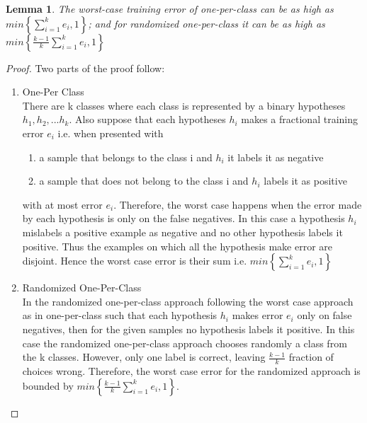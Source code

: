 \documentclass[11pt]{article}
\newtheorem{lemma}[theorem]{Lemma}
\begin{document}
   \begin{lemma} 
        The worst-case training error of one-per-class can be as high as $min\left\{\sum_{i=1}^k e_i , 1\right\}$; and for randomized one-per-class it can be as high as $min\left\{\frac{k-1}{k}\sum_{i=1}^k e_i,1\right\}$
   \end{lemma}
   \begin{proof} 
        Two parts of the proof follow:
         \begin{enumerate}
                \item One-Per Class\\
                    There are k classes where each class is represented by a binary hypotheses $h_1,h_2,...h_k$. Also suppose that each hypotheses $h_i$ makes a fractional training error $e_i$ i.e. when presented with 
                    \begin{enumerate}
                        \item a sample that belongs to the class i and $h_i$ it labels it as negative
                         \item a sample that does not belong to the class i and $h_i$ labels it as positive
                    \end{enumerate}
                    with at most error $e_i$. Therefore, the worst case happens when the error made by each hypothesis is only on the false negatives. In this case a hypothesis $h_i$ mislabels a positive example as negative and no other hypothesis labels it positive. Thus the examples on which all the hypothesis make error are disjoint. Hence the worst case error is their sum i.e. $min\left\{\sum_{i=1}^k e_i , 1\right\}$ 
        
                \item Randomized One-Per-Class\\
                    In the randomized one-per-class approach following the worst case approach as in one-per-class such that each hypothesis $h_i$ makes error $e_i$ only on false negatives, then for the given samples no hypothesis labels it positive. In this case the randomized one-per-class approach chooses randomly a class from the k classes. However, only one label is correct, leaving $\frac{k-1}{k}$ fraction of choices wrong. Therefore, the worst case error for the randomized approach is bounded by $min\left\{\frac{k-1}{k}\sum_{i=1}^k e_i,1\right\}$.
         \end{enumerate} 
    \end{proof}
    
\end{document}
